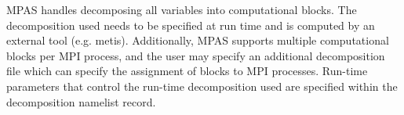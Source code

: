 MPAS handles decomposing all variables into computational blocks. The
decomposition used needs to be specified at run time and is computed by an
external tool (e.g. metis). Additionally, MPAS supports multiple computational
blocks per MPI process, and the user may specify an additional decomposition
file which can specify the assignment of blocks to MPI processes. Run-time
parameters that control the run-time decomposition used are specified within
the decomposition namelist record.

